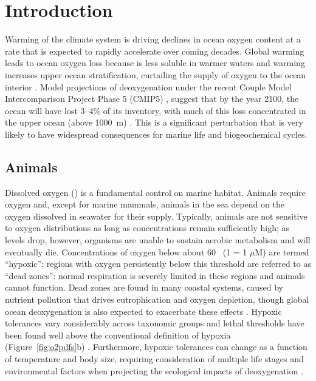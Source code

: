 \documentclass{report_chapter}
\begin{document}
\section{Introduction}\label{loc:intro}

Warming of the climate system is driving declines in ocean oxygen content at a rate that is expected to rapidly accelerate over coming decades.
Global warming leads to ocean oxygen loss because \OO{} is less soluble in warmer waters and warming increases upper ocean stratification, curtailing the supply of oxygen to the ocean interior \citep{Keeling-Kortzinger-etal-2010}.
Model projections of deoxygenation under the recent Couple Model Intercomparison Project Phase 5 (CMIP5) \citep{Taylor-Stouffer-etal-2012}, suggest that by the year 2100, the ocean will have lost 3--4\% of its \OO{} inventory, with much of this loss concentrated in the upper ocean (above 1000~m) \citep{Bopp-Resplandy-etal-2013,Cocco-Joos-etal-2013}.
This is a significant perturbation that is very likely to have widespread consequences for marine life and biogeochemical cycles.

\subsection{Animals}

Dissolved oxygen (\OO{}) is a fundamental control on marine habitat.
Animals require oxygen and, except for marine mammals, animals in the sea depend on the oxygen dissolved in seawater for their supply.
Typically, animals are not sensitive to oxygen distributions as long as concentrations remain sufficiently high; as \OO{} levels drop, however, organisms are unable to sustain aerobic metabolism and will eventually die.
Concentrations of oxygen below about 60~\mmolmmm{} (1  \mmolmmm = 1
$\mu$M) are termed ``hypoxic''; regions with oxygen persistently below this threshold are referred to as ``dead zones'': normal respiration is severely limited in these regions and animals cannot function.
Dead zones are found in many coastal systems, caused by nutrient pollution that drives eutrophication and oxygen depletion, though global ocean deoxygenation is also expected to exacerbate these effects \citep{Rabalais-Turner-etal-2002,Diaz-Rosenberg-2008}.
Hypoxic tolerances vary considerably across taxonomic groups and lethal thresholds have been found well above the conventional definition of hypoxia (Figure~\ref{fig:o2pdfs}b) \citep{Vaquer-Sunyer-Duarte-2008}.
Furthermore, hypoxic tolerances can change as a function of temperature and body size, requiring consideration of multiple life stages and environmental factors when projecting the ecological impacts of deoxygenation \citep{Portner-Farrell-2008,Deutsch-Ferrel-etal-2015}.
\end{document}
